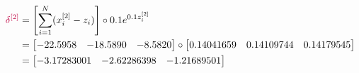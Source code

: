 \documentclass[12pt]{article}
\begin{document}
\begin{enumerate}[leftmargin=\labelsep]
          \begin{equation*}
            \begin{aligned}
              \textcolor{purple}{\delta^{[2]}} & = \left[\sum_{i=1}^N(x_i^{[2]} - z_i)\right] \circ 0.1e^{0.1z_i^{[2]}}    \\
                                               & = \begin{bmatrix}
                                                -22.5958 & -18.5890 & -8.5820\\
                                              \end{bmatrix} \circ \begin{bmatrix}
                                                0.14041659 & 0.14109744 & 0.14179545\\
                                              \end{bmatrix} \\
                                               & = \begin{bmatrix}
                                                -3.17283001 & -2.62286398 & -1.21689501\\
                                              \end{bmatrix}
            \end{aligned}
          \end{equation*}


\end{enumerate}
\end{document}
